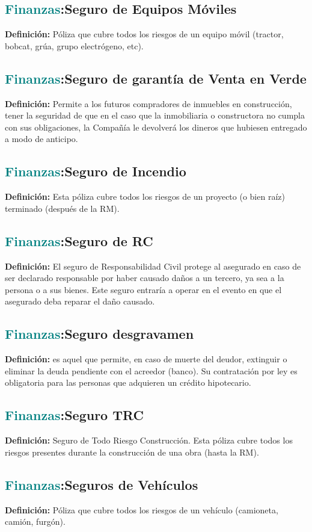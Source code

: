 \documentclass[12pt]{article}
\begin{document}
\subsection{\textcolor{teal}{Finanzas}:{Seguro de Equipos Móviles}}
\textbf{Definición:} Póliza que cubre todos los riesgos de un equipo móvil (tractor, bobcat, grúa, grupo electrógeno, etc).
\subsection{\textcolor{teal}{Finanzas}:{Seguro de garantía de Venta en Verde}}
\textbf{Definición:} Permite a los futuros compradores de inmuebles en construcción, tener la seguridad de que en el caso que la inmobiliaria o constructora no cumpla con sus obligaciones, la Compañía le devolverá los dineros que hubiesen entregado a modo de anticipo.
\subsection{\textcolor{teal}{Finanzas}:{Seguro de Incendio}}
\textbf{Definición:} Esta póliza cubre todos los riesgos de un proyecto (o bien raíz) terminado (después de la RM).
\subsection{\textcolor{teal}{Finanzas}:{Seguro de RC}}
\textbf{Definición:} El seguro de Responsabilidad Civil protege al asegurado en caso de ser declarado responsable por haber causado daños a un tercero, ya sea a la persona o a sus bienes. Este seguro entraría a operar en el evento en que el asegurado deba reparar el daño causado.
\subsection{\textcolor{teal}{Finanzas}:{Seguro desgravamen}}
\textbf{Definición:} es aquel que permite, en caso de muerte del deudor, extinguir o eliminar la deuda pendiente con el acreedor (banco). Su contratación por ley es obligatoria para las personas que adquieren un crédito hipotecario.
\subsection{\textcolor{teal}{Finanzas}:{Seguro TRC}}
\textbf{Definición:} Seguro de Todo Riesgo Construcción. Esta póliza cubre todos los riesgos presentes durante la construcción de una obra (hasta la RM).
\subsection{\textcolor{teal}{Finanzas}:{Seguros de Vehículos}}
\textbf{Definición:} Póliza que cubre todos los riesgos de un vehículo (camioneta, camión, furgón).
\end{document}
